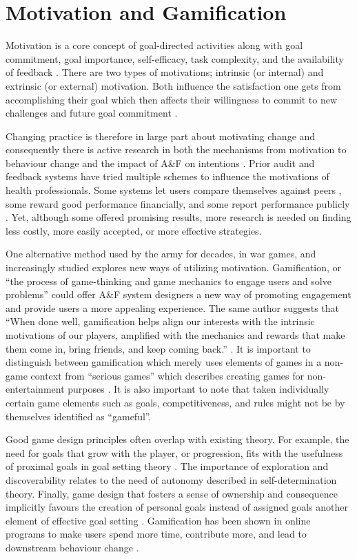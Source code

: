 \section{Motivation and Gamification}

Motivation is a core concept of goal-directed activities along with goal commitment, goal importance, self-efficacy, task complexity, and the availability of feedback \cite{locke2002building}.  There are two types of motivations; intrinsic (or internal) and extrinsic (or external) motivation. Both influence the satisfaction one gets from accomplishing their goal which then affects their willingness to commit to new challenges and future goal commitment \cite{locke2002building}.

Changing practice is therefore in large part about motivating change and consequently there is active research in both the mechanisms from motivation to behaviour change \cite{michie2011behaviour} and the impact of A\&F on intentions \cite{gude2018health}. Prior audit and feedback systems have tried multiple schemes to influence the motivations of health professionals. Some systems let users compare themselves against peers \cite{ehrenfeld2014automated}, some reward good performance financially\cite{campbell2007payperf}, and some report performance publicly \cite{schneider1998use}. Yet, although some offered promising results, more research is needed on finding less costly, more easily accepted, or more effective strategies.

One alternative method used by the army for decades, in war games, and increasingly studied explores new ways of utilizing motivation.  Gamification, or “the process of game-thinking and game mechanics to engage users and solve problems” \cite{zichermann2011gamification} could offer A\&F system designers a new way of promoting engagement and provide users a more appealing experience. The same author suggests that “When done well, gamification helps align our interests with the intrinsic motivations of our players, amplified with the mechanics and rewards that make them come in, bring friends, and keep coming back.” \cite{zichermann2011gamification}. It is important to distinguish between gamification which merely uses elements of games in a non-game context from “serious games” which describes creating games for non-entertainment purposes \cite{deterding2011game}. It is also important to note that taken individually certain game elements such as goals, competitiveness, and rules might not be by themselves identified as “gameful”. 

Good game design principles often overlap with existing theory. For example, the need for goals that grow with the player, or progression, fits with the usefulness of proximal goals in goal setting theory \cite{locke2002building}. The importance of exploration and discoverability relates to the need of autonomy described in self-determination theory. Finally, game design that fosters a sense of ownership and consequence implicitly favours the creation of personal goals instead of assigned goals another element of effective goal setting \cite{locke1990theory}. Gamification has been shown in online programs to make users spend more time, contribute more, and lead to downstream behaviour change \cite{looyestyn2017does}.